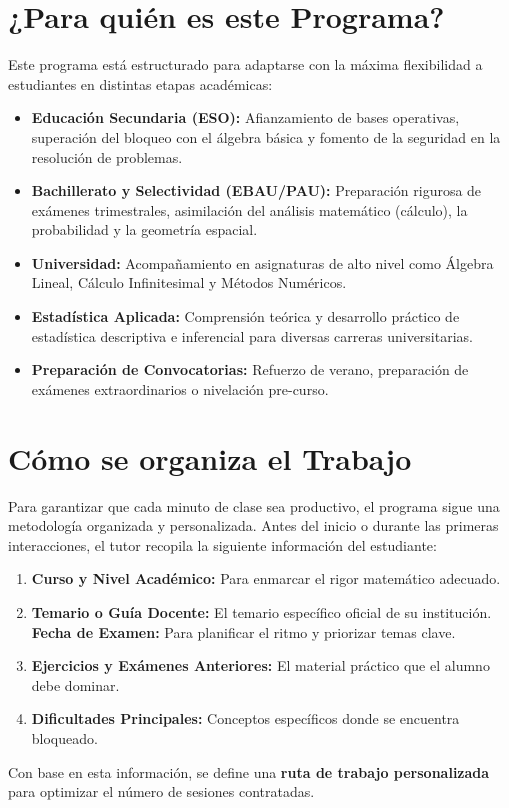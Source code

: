 \documentclass[11pt,a4paper]{article}
\begin{document}
\section{¿Para quién es este Programa?}
Este programa está estructurado para adaptarse con la máxima flexibilidad a estudiantes en distintas etapas académicas:
\begin{itemize}
    \item \textbf{Educación Secundaria (ESO):} Afianzamiento de bases operativas, superación del bloqueo con el álgebra básica y fomento de la seguridad en la resolución de problemas.
    \item \textbf{Bachillerato y Selectividad (EBAU/PAU):} Preparación rigurosa de exámenes trimestrales, asimilación del análisis matemático (cálculo), la probabilidad y la geometría espacial.
    \item \textbf{Universidad:} Acompañamiento en asignaturas de alto nivel como Álgebra Lineal, Cálculo Infinitesimal y Métodos Numéricos.
    \item \textbf{Estadística Aplicada:} Comprensión teórica y desarrollo práctico de estadística descriptiva e inferencial para diversas carreras universitarias.
    \item \textbf{Preparación de Convocatorias:} Refuerzo de verano, preparación de exámenes extraordinarios o nivelación pre-curso.
\end{itemize}

\newpage
\section{Cómo se organiza el Trabajo}
Para garantizar que cada minuto de clase sea productivo, el programa sigue una metodología organizada y personalizada. Antes del inicio o durante las primeras interacciones, el tutor recopila la siguiente información del estudiante:
\begin{enumerate}
    \item \textbf{Curso y Nivel Académico:} Para enmarcar el rigor matemático adecuado.
    \item \textbf{Temario o Guía Docente:} El temario específico oficial de su institución.
    \textbf{Fecha de Examen:} Para planificar el ritmo y priorizar temas clave.
    \item \textbf{Ejercicios y Exámenes Anteriores:} El material práctico que el alumno debe dominar.
    \item \textbf{Dificultades Principales:} Conceptos específicos donde se encuentra bloqueado.
\end{enumerate}
Con base en esta información, se define una \textbf{ruta de trabajo personalizada} para optimizar el número de sesiones contratadas.
\end{document}
